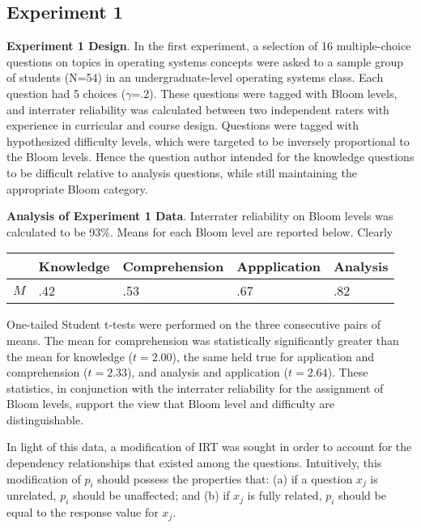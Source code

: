 \subsection{Experiment 1}

\textbf{Experiment 1 Design}. In the first experiment, a selection of 16
multiple-choice questions on topics in operating systems concepts were asked to
a sample group of students (N=54) in an undergraduate-level operating systems
class.  Each question had 5 choices ($\gamma$=.2). These questions were tagged
with Bloom levels, and interrater reliability was calculated between two
independent raters with experience in curricular and course design.  Questions
were tagged with hypothesized difficulty levels, which were targeted to be
inversely proportional to the Bloom levels.  Hence the question author intended
for the knowledge questions to be difficult relative to analysis questions,
while still maintaining the appropriate Bloom category.


\textbf{Analysis of Experiment 1 Data}.  Interrater reliability on Bloom levels
was calculated to be 93\%.  Means for each Bloom level are reported below.
Clearly

\begin{center}
\begin{tabular}{|l|l|l|l|l|}
                                                                 \hline
      &   Knowledge & Comprehension & Appplication & Analysis \\ \hline
 $M$  &  .42 & .53 & .67 & .82  \\ \hline
\end{tabular}
\end{center}

One-tailed Student t-tests were performed on the three consecutive pairs of
means.  The mean for comprehension was statistically significantly greater than
the mean for knowledge ($t=2.00$), the same held true for application and
comprehension ($t=2.33$), and analysis and application ($t=2.64$).  These
statistics, in conjunction with the interrater reliability for the assignment
of Bloom levels, support the view that Bloom level and difficulty are
distinguishable.

In light of this data, a modification of IRT was sought in order to account for
the dependency relationships that existed among the questions.  Intuitively,
this modification of $p_i$ should possess the properties that: (a) if a
question $x_j$ is unrelated, $p_i$ should be unaffected; and (b) if $x_j$ is
fully related, $p_i$ should be equal to the response value for $x_j$. 

